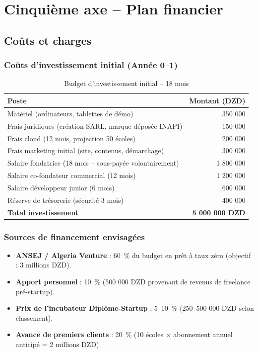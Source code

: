 \documentclass[12pt,a4paper,oneside]{report}
\begin{document}
\section{Cinquième axe -- Plan financier}

\subsection{Coûts et charges}

\subsubsection{Coûts d'investissement initial (Année 0--1)}

\begin{table}[H]
\centering
\caption{Budget d'investissement initial -- 18 mois}
\label{tab:investissement}
\begin{tabularx}{\textwidth}{Xr}
\toprule
\textbf{Poste} & \textbf{Montant (DZD)} \\
\midrule
Matériel (ordinateurs, tablettes de démo) & 350 000 \\
Frais juridiques (création SARL, marque déposée INAPI) & 150 000 \\
Frais cloud (12 mois, projection 50 écoles) & 200 000 \\
Frais marketing initial (site, contenus, démarchage) & 300 000 \\
Salaire fondatrice (18 mois -- sous-payée volontairement) & 1 800 000 \\
Salaire co-fondateur commercial (12 mois) & 1 200 000 \\
Salaire développeur junior (6 mois) & 600 000 \\
Réserve de trésorerie (sécurité 3 mois) & 400 000 \\
\midrule
\textbf{Total investissement} & \textbf{5 000 000 DZD} \\
\bottomrule
\end{tabularx}
\end{table}

\subsubsection{Sources de financement envisagées}

\begin{itemize}
  \item \textbf{ANSEJ / Algeria Venture} : 60~\% du budget en prêt à taux zéro (objectif : 3 millions DZD).
  \item \textbf{Apport personnel} : 10~\% (500 000 DZD provenant de revenus de freelance pré-startup).
  \item \textbf{Prix de l'incubateur Diplôme-Startup} : 5--10~\% (250--500 000 DZD selon classement).
  \item \textbf{Avance de premiers clients} : 20~\% (10 écoles × abonnement annuel anticipé = 2 millions DZD).
\end{itemize}
\end{document}
